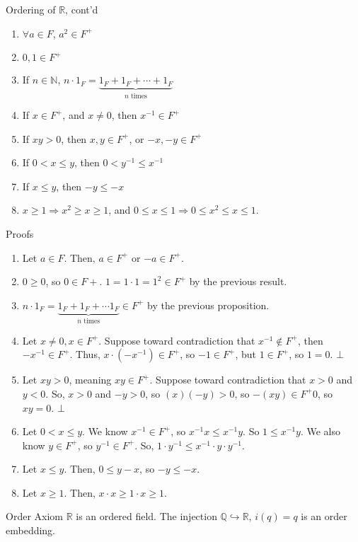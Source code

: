 \documentclass[10pt]{extarticle}
\newcommand{\N}{\mathbb{N}}
\newcommand{\Q}{\mathbb{Q}}
\newcommand{\R}{\mathbb{R}}
\begin{document}
\begin{problem}{Ordering of $\R$, cont'd}
\begin{description}
    \end{description}
    \begin{enumerate}[(1)]
      \item $\forall a\in F$, $a^{2}\in F^+$
      \item $0,1\in F^+$
      \item If $n\in \N$, $n\cdot 1_{F} = \underbrace{1_F + 1_F + \cdots + 1_F}_{\text{$n$ times}}$
      \item If $x\in F^+$, and $x\neq 0$, then $x^{-1}\in F^+$
      \item If $xy > 0$, then $x,y\in F^+$, or $-x,-y\in F^{+}$
      \item If $0 < x \leq y$, then $0 < y^{-1} \leq x^{-1}$
      \item If $x\leq y$, then $-y\leq -x$
      \item $x\geq 1 \Rightarrow x^2 \geq x \geq 1$, and $0\leq x\leq 1 \Rightarrow 0 \leq x^2 \leq x \leq 1$.
    \end{enumerate}
    \begin{problem}{Proofs}
      \begin{enumerate}[(1)]
        \item Let $a\in F$. Then, $a\in F^+$ or $-a\in F^+$.
        \item $0\geq 0$, so $0\in F+$. $1 = 1\cdot 1 = 1^2 \in F^+$ by the previous result.
        \item $n\cdot 1_F = \underbrace{1_F + 1_F + \cdots 1_F}_{\text{$n$ times}}\in F^+$ by the previous proposition.
        \item Let $x\neq 0, x\in F^+$. Suppose toward contradiction that $x^{-1}\notin F^+$, then $-x^{-1}\in F^+$. Thus, $x\cdot(-x^{-1})\in F^+$, so $-1\in F^+$, but $1\in F^+$, so $1 = 0$. $\bot$
        \item Let $xy > 0$, meaning $xy\in F^+$. Suppose toward contradiction that $x>0$ and $y<0$. So, $x>0$ and $-y > 0$, so $(x)(-y) > 0$, so $-(xy) \in F^+ 0$, so $xy = 0$. $\bot$
        \item Let $0 < x \leq y$. We know $x^{-1}\in F^+$, so $x^{-1}x \leq x^{-1}y$. So $1\leq x^{-1}y$. We also know $y\in F^+$, so $y^{-1}\in F^+$. So, $1\cdot y^{-1}\leq x^{-1}\cdot y\cdot y^{-1}$. 
        \item Let $x\leq y$. Then, $0\leq y-x$, so $-y\leq -x$.
        \item Let $x\geq 1$. Then, $x\cdot x \geq 1\cdot x \geq 1$.
      \end{enumerate}
    \end{problem}
    \begin{problem}{Order Axiom}
      $\R$ is an ordered field. The injection $\Q\hookrightarrow \R$, $i(q) = q$ is an order embedding.
    \end{problem}
  \end{problem}
\end{document}
